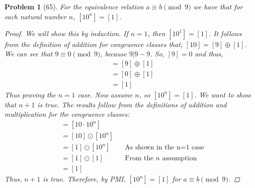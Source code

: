 \documentclass{article}
\theoremstyle{problem}
\newtheorem{prob}{Problem}
\theoremstyle{plain}
\theoremstyle{remark}
\begin{document}
\begin{prob}[65]
  For the equivalence relation $a \equiv b \pmod{9}$ we have that for each natural number $n$, $[10^n] = [1]$.
  \begin{proof}
    We will show this by induction. If $n = 1$, then $[10^1] = [1]$. It follows from the definition of addition for congruence classes that, $[10] = [9] \oplus [1]$. We can see that $9 \equiv 0 \pmod{9}$, because $9\big| 9 - 9$. So, $[9] = 0$ and thus,
    \begin{align*}
      [10] &= [9] \oplus [1]\\
      &= [0] \oplus [1]\\
      &= [1]
    \end{align*}
    Thus proving the $n=1$ case. Now assume $n$, so $[10^n] = [1]$. We want to show that $n + 1$ is true. The results follow from the definitions of addition and multiplication for the congruence classes:
    \begin{align*}
      [10^{n+1}] &= [10 \cdot 10^n]\\
      &= [10] \odot [10^n]\\
      &= [1] \odot [10^n]&&\text{As shown in the n=1 case}\\
      &= [1] \odot [1]&&\text{From the } n \text{ assumption}\\
      &= [1]
    \end{align*}
    Thus, $n + 1$ is true. Therefore, by PMI, $[10^n] = [1]$ for $a \equiv b \pmod{9}$.
  \end{proof}
\end{prob}
%
\end{document}
